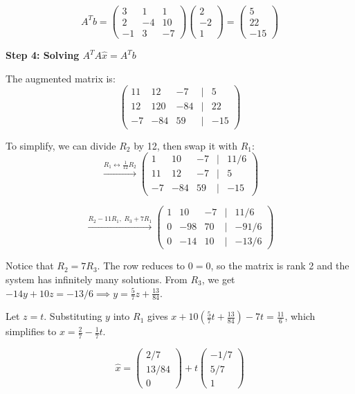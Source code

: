 \documentclass[12pt,a3paper]{article}
\begin{document}
\begin{tcolorbox}[enhanced,breakable,
  colback=cB!4,colframe=cB,boxrule=0.8pt,arc=5pt,
  title={\textbf{Answer --- Least Squares Analysis}},
  fonttitle=\bfseries\color{white},colbacktitle=cB]
$$A^T b = \begin{pmatrix} 3 & 1 & 1 \\ 2 & -4 & 10 \\ -1 & 3 & -7 \end{pmatrix} \begin{pmatrix} 2 \\ -2 \\ 1 \end{pmatrix} = \begin{pmatrix} 5 \\ 22 \\ -15 \end{pmatrix}$$

\medskip
\textbf{Step 4: Solving $A^T A \hat{x} = A^T b$}

The augmented matrix is:
$$\begin{pmatrix} 11 & 12 & -7 & | & 5 \\ 12 & 120 & -84 & | & 22 \\ -7 & -84 & 59 & | & -15 \end{pmatrix}$$

To simplify, we can divide $R_2$ by 12, then swap it with $R_1$:
$$\xrightarrow{R_1 \leftrightarrow \frac{1}{12}R_2} \begin{pmatrix} 1 & 10 & -7 & | & 11/6 \\ 11 & 12 & -7 & | & 5 \\ -7 & -84 & 59 & | & -15 \end{pmatrix}$$

$$\xrightarrow{R_2 - 11R_1,\; R_3 + 7R_1} \begin{pmatrix} 1 & 10 & -7 & | & 11/6 \\ 0 & -98 & 70 & | & -91/6 \\ 0 & -14 & 10 & | & -13/6 \end{pmatrix}$$

Notice that $R_2 = 7R_3$. The row reduces to $0=0$, so the matrix is rank 2 and the system has infinitely many solutions. From $R_3$, we get $-14y + 10z = -13/6 \implies y = \frac{5}{7}z + \frac{13}{84}$. 

Let $z = t$. Substituting $y$ into $R_1$ gives $x + 10(\frac{5}{7}t + \frac{13}{84}) - 7t = \frac{11}{6}$, which simplifies to $x = \frac{2}{7} - \frac{1}{7}t$.

$$\hat{x} = \begin{pmatrix} 2/7 \\ 13/84 \\ 0 \end{pmatrix} + t \begin{pmatrix} -1/7 \\ 5/7 \\ 1 \end{pmatrix}$$


\end{tcolorbox}
\end{document}
